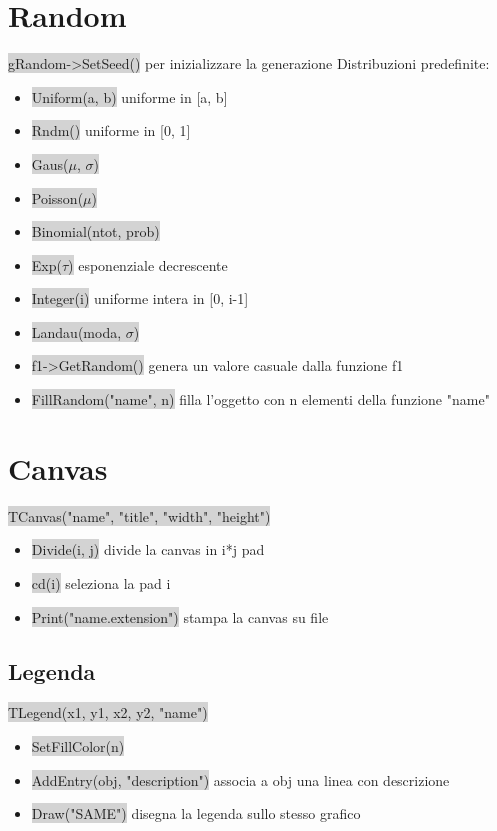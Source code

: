 \documentclass[a4paper]{article}
\begin{document}
\section{Random}
    \colorbox{LightGray}{gRandom->SetSeed()} per inizializzare la generazione
    Distribuzioni predefinite:
    \begin{itemize}
        \item \colorbox{LightGray}{Uniform(a, b)} uniforme in [a, b]
        \item \colorbox{LightGray}{Rndm()} uniforme in [0, 1]
        \item \colorbox{LightGray}{Gaus($\mu$, $\sigma$)}
        \item \colorbox{LightGray}{Poisson($\mu$)}
        \item \colorbox{LightGray}{Binomial(ntot, prob)}
        \item \colorbox{LightGray}{Exp($\tau$)} esponenziale decrescente
        \item \colorbox{LightGray}{Integer(i)} uniforme intera in [0, i-1]
        \item \colorbox{LightGray}{Landau(moda, $\sigma$)}
        \item \colorbox{LightGray}{f1->GetRandom()} genera un valore casuale dalla funzione f1
        \item \colorbox{LightGray}{FillRandom("name", n)} filla l'oggetto con n elementi della funzione "name"
    \end{itemize}
\section{Canvas}
    \colorbox{LightGray}{TCanvas("name", "title", "width", "height")}\\
    \begin{itemize}
        \item \colorbox{LightGray}{Divide(i, j)} divide la canvas in i*j pad
        \item \colorbox{LightGray}{cd(i)} seleziona la pad i
        \item \colorbox{LightGray}{Print("name.extension")} stampa la canvas su file
    \end{itemize}
    \subsection{Legenda}
    \colorbox{LightGray}{TLegend(x1, y1, x2, y2, "name")}\\
    \begin{itemize}
        \item \colorbox{LightGray}{SetFillColor(n)}
        \item \colorbox{LightGray}{AddEntry(obj, "description")} associa a obj una linea con descrizione
        \item \colorbox{LightGray}{Draw("SAME")} disegna la legenda sullo stesso grafico
    \end{itemize}
\end{document}
